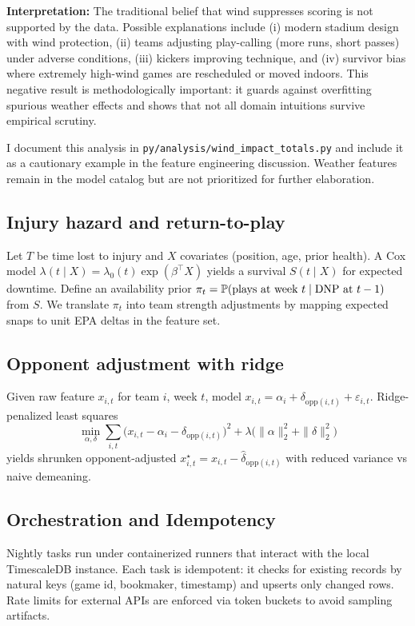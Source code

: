 \textbf{Interpretation:} The traditional belief that wind suppresses scoring is not supported by the data. Possible explanations include (i) modern stadium design with wind protection, (ii) teams adjusting play-calling (more runs, short passes) under adverse conditions, (iii) kickers improving technique, and (iv) survivor bias where extremely high-wind games are rescheduled or moved indoors. This negative result is methodologically important: it guards against overfitting spurious weather effects and shows that not all domain intuitions survive empirical scrutiny.

I document this analysis in \texttt{py/analysis/wind\_impact\_totals.py} and include it as a cautionary example in the feature engineering discussion. Weather features remain in the model catalog but are not prioritized for further elaboration.

\subsection{Injury hazard and return-to-play}\label{subsec:injury-hazard}
Let $T$ be time lost to injury and $X$ covariates (position, age, prior health). A Cox model
$\lambda(t\mid X)=\lambda_0(t)\exp(\beta^\top X)$ yields a survival $S(t\mid X)$ for expected
downtime. Define an availability prior $\pi_t=\mathbb{P}(\text{plays at week }t\mid \text{DNP at }t-1)$
from $S$. We translate $\pi_t$ into team strength adjustments by mapping expected snaps to unit
EPA deltas in the feature set.

\subsection{Opponent adjustment with ridge}\label{subsec:opp-ridge}
Given raw feature $x_{i,t}$ for team $i$, week $t$, model
$x_{i,t} = \alpha_i + \delta_{\text{opp}(i,t)} + \varepsilon_{i,t}$. Ridge-penalized least squares
\[
\min_{\alpha,\delta}\sum_{i,t}\!\big(x_{i,t}-\alpha_i-\delta_{\text{opp}(i,t)}\big)^2
+ \lambda\big(\|\alpha\|_2^2+\|\delta\|_2^2\big)
\]
yields shrunken opponent-adjusted $x_{i,t}^\star=x_{i,t}-\hat\delta_{\text{opp}(i,t)}$ with reduced
variance vs naive demeaning.



\subsection{Orchestration and Idempotency}
Nightly tasks run under containerized runners that interact with the local TimescaleDB instance. Each task is idempotent: it checks for existing records by natural keys (game id, bookmaker, timestamp) and upserts only changed rows. Rate limits for external APIs are enforced via token buckets to avoid sampling artifacts.

